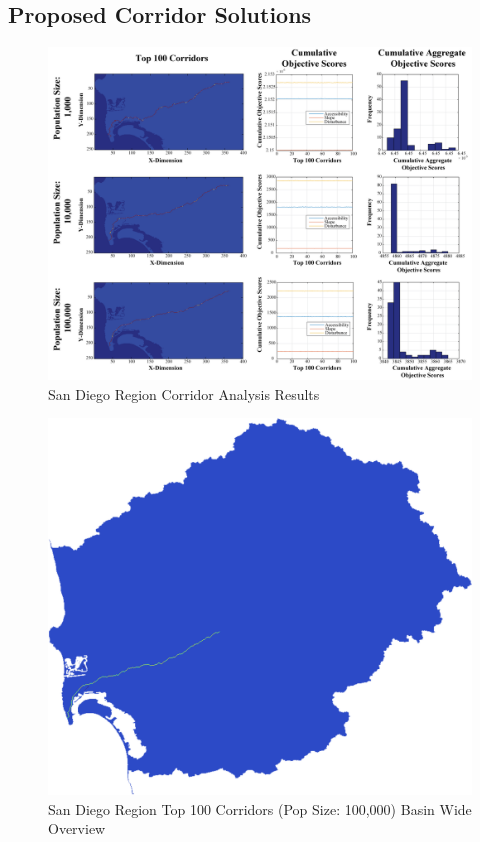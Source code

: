     \subsection{Proposed Corridor Solutions}
    
        \begin{figure}[!h]
            \begin{center}
            \includegraphics[width=6in]{figures/SanDiego_PathwayResults.png}   
            \caption{San Diego Region Corridor Analysis Results}
            \label{fig:SDresults}
            \end{center}
        \end{figure}

        \begin{figure}[!h]
            \begin{center}
            \includegraphics[width=5.5in]{figures/SanDiego_PathwayLarge.png}   
            \caption{San Diego Region Top 100 Corridors (Pop Size: 100,000) Basin Wide Overview}
            \label{fig:SDsolutionOverview}
            \end{center}
        \end{figure}
        
